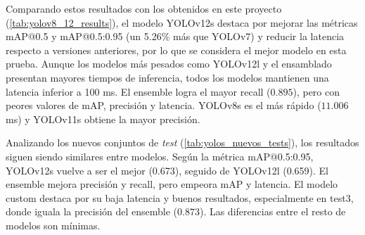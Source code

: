 \documentclass[12pt,a4paper,onecolumn,oneside]{report}
\begin{document}
\begin{table}[H]
  \caption{Resultados de los modelos sobre el conjunto de \textit{test} original}
  \centering
  \label{tab:yolov8_12_results}
\end{table}

Comparando estos resultados con los obtenidos en este proyecto (\autoref{tab:yolov8_12_results}), el modelo YOLOv12s destaca por mejorar las métricas mAP@0.5 y mAP@0.5:0.95 (un 5.26\% más que YOLOv7) y 
reducir la latencia respecto a versiones anteriores, por lo que se considera el mejor modelo en esta prueba. Aunque los modelos más pesados como YOLOv12l y el ensamblado 
presentan mayores tiempos de inferencia, todos los modelos mantienen una latencia inferior a 100 ms. El ensemble logra el mayor recall ($0.895$), pero con peores valores de mAP, 
precisión y latencia. YOLOv8s es el más rápido ($11.006$ ms) y YOLOv11s obtiene la mayor precisión.

Analizando los nuevos conjuntos de \textit{test} (\autoref{tab:yolos_nuevos_tests}), los resultados siguen siendo similares entre modelos. Según la métrica mAP@0.5:0.95, YOLOv12s vuelve a ser el mejor (0.673), seguido de YOLOv12l (0.659). 
El ensemble mejora precisión y recall, pero empeora mAP y latencia. El modelo custom destaca por su baja latencia y buenos resultados, especialmente en test3, 
donde iguala la precisión del ensemble ($0.873$). Las diferencias entre el resto de modelos son mínimas.
\end{document}
